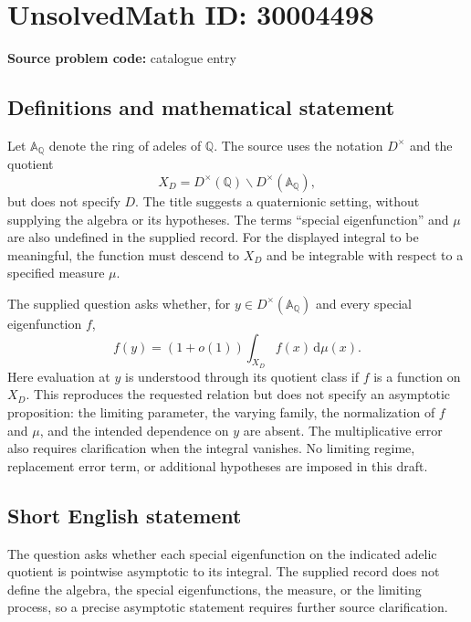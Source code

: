 \documentclass[11pt]{article}
\newcommand{\Q}{\mathbb{Q}}
\begin{document}
\section*{UnsolvedMath ID: 30004498}
\textbf{Source problem code:} catalogue entry
\subsection{Definitions and mathematical statement}
Let \(\mathbb A_{\Q}\) denote the ring of adeles of \(\Q\). The source uses the notation \(D^{\times}\) and the quotient
\[
X_D=D^{\times}(\Q)\backslash D^{\times}(\mathbb A_{\Q}),
\]
but does not specify \(D\). The title suggests a quaternionic setting, without supplying the algebra or its hypotheses. The terms ``special eigenfunction'' and \(\mu\) are also undefined in the supplied record. For the displayed integral to be meaningful, the function must descend to \(X_D\) and be integrable with respect to a specified measure \(\mu\).

The supplied question asks whether, for \(y\in D^{\times}(\mathbb A_{\Q})\) and every special eigenfunction \(f\),
\[
f(y)=(1+o(1))\int_{X_D}f(x)\,\mathrm d\mu(x).
\]
Here evaluation at \(y\) is understood through its quotient class if \(f\) is a function on \(X_D\). This reproduces the requested relation but does not specify an asymptotic proposition: the limiting parameter, the varying family, the normalization of \(f\) and \(\mu\), and the intended dependence on \(y\) are absent. The multiplicative error also requires clarification when the integral vanishes. No limiting regime, replacement error term, or additional hypotheses are imposed in this draft.
\subsection{Short English statement}
The question asks whether each special eigenfunction on the indicated adelic quotient is pointwise asymptotic to its integral. The supplied record does not define the algebra, the special eigenfunctions, the measure, or the limiting process, so a precise asymptotic statement requires further source clarification.
\end{document}
